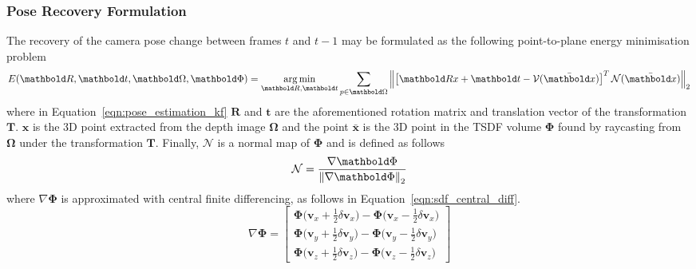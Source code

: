\subsubsection{Pose Recovery Formulation}
\label{subsub:moseg_static_camera_poserec}
The recovery of the camera pose change between frames \(t\) and \(t-1\) may be
formulated as the following point-to-plane energy minimisation problem
\begin{equation}
  \label{eqn:pose_estimation_kf}
  E(\bm{R}, \bm{t}, \bm{\Omega}, \bm{\Phi}) =
  \argmin_{\bm{R}, \bm{t}} \sum_{p \in \bm{\Omega}}
  \norm{\left[
    \bm{Rx} + \bm{t} - \mathcal{V}(\bar{\bm{x}})
  \right]^{T}
  \mathcal{N}(\bar{\bm{x}})}
\end{equation}
where in Equation~\ref{eqn:pose_estimation_kf} \(\bm{R}\) and \(\bm{t}\) are 
the aforementioned rotation matrix and translation vector of the transformation 
\(\bm{T}\). \(\bm{x}\) is the 3D point extracted from the depth image 
\(\bm{\Omega}\) and the point \(\bar{\bm{x}}\) is the 3D point in the TSDF 
volume \(\bm{\Phi}\) found by raycasting from \(\bm{\Omega}\) under the 
transformation \(\bm{T}\). Finally, \(\mathcal{N}\) is a normal map of 
\(\bm{\Phi}\) and is defined as follows
\begin{equation}
  \label{eqn:normal_map_definition}
  \mathcal{N} = \frac{\nabla \bm{\Phi}}{\norm{\nabla \bm{\Phi}}}
\end{equation}
where \(\nabla \bm{\Phi}\) is approximated with central finite differencing, 
as follows in Equation~\ref{eqn:sdf_central_diff}.
\begin{equation}
  \label{eqn:sdf_central_diff}
  \nabla \bm{\Phi} = 
    \begin{bmatrix}
      \bm{\Phi} \big(\bm{v}_{x} + \frac{1}{2}\delta \bm{v}_{x}\big) -
      \bm{\Phi} \big(\bm{v}_{x} - \frac{1}{2}\delta \bm{v}_{x}\big)\\
      \bm{\Phi} \big(\bm{v}_{y} + \frac{1}{2}\delta \bm{v}_{y}\big) -
      \bm{\Phi} \big(\bm{v}_{y} - \frac{1}{2}\delta \bm{v}_{y}\big)\\
      \bm{\Phi} \big(\bm{v}_{z} + \frac{1}{2}\delta \bm{v}_{z}\big) -
      \bm{\Phi} \big(\bm{v}_{z} - \frac{1}{2}\delta \bm{v}_{z}\big)
    \end{bmatrix}
\end{equation}

